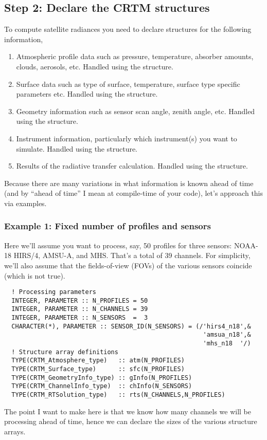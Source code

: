 \subsection{Step 2: Declare the CRTM structures}
To compute satellite radiances you need to declare structures for the following information,
\begin{enumerate}
  \item Atmospheric profile data such as pressure, temperature, absorber amounts, clouds, aerosols, etc. Handled using the \Atmosphere{} structure.
  \item Surface data such as type of surface, temperature, surface type specific parameters etc. Handled using the \Surface{} structure.
  \item Geometry information such as sensor scan angle, zenith angle, etc. Handled using the \GeometryInfo{} structure.
  \item Instrument information, particularly which instrument(s) you want to simulate. Handled using the \ChannelInfo{} structure.
  \item Results of the radiative transfer calculation. Handled using the \RTSolution{} structure.
\end{enumerate}
Because there are many variations in what information is known ahead of time (and by ``ahead of time'' I mean at compile-time of your code), let's approach this via examples.

\subsubsection{Example 1: Fixed number of profiles \textbf{and} sensors}
Here we'll assume you want to process, say, 50 profiles for three sensors: NOAA-18 HIRS/4, AMSU-A, and MHS. That's a total of 39 channels. For simplicity, we'll also assume that the fields-of-view (FOVs) of the various sensors coincide (which is not true).
\begin{ttfamily}
  \begin{verbatim}
  ! Processing parameters
  INTEGER, PARAMETER :: N_PROFILES = 50
  INTEGER, PARAMETER :: N_CHANNELS = 39
  INTEGER, PARAMETER :: N_SENSORS  =  3
  CHARACTER(*), PARAMETER :: SENSOR_ID(N_SENSORS) = (/'hirs4_n18',&
                                                      'amsua_n18',&
                                                      'mhs_n18  '/)
  ! Structure array definitions
  TYPE(CRTM_Atmosphere_type)   :: atm(N_PROFILES)
  TYPE(CRTM_Surface_type)      :: sfc(N_PROFILES)
  TYPE(CRTM_GeometryInfo_type) :: gInfo(N_PROFILES)  
  TYPE(CRTM_ChannelInfo_type)  :: chInfo(N_SENSORS)  
  TYPE(CRTM_RTSolution_type)   :: rts(N_CHANNELS,N_PROFILES)\end{verbatim}
\end{ttfamily}
The point I want to make here is that we know how many channels we will be processing ahead of time, hence we can declare the sizes of the various structure arrays.


